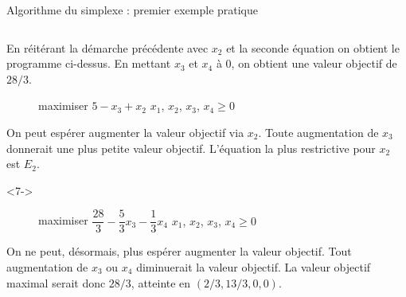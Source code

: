\documentclass[aspectratio = 169]{beamer}
\begin{document}
\begin{frame}{Algorithme du simplexe : premier exemple pratique}
\begin{columns}
\begin{column}{.5\textwidth}
\begin{onlyenv}
{{\begin{figure}
                \end{figure}
              } \vspace{-1em}
              En réitérant la démarche précédente avec $x_2$ et la
              seconde équation on obtient le programme ci-dessus. En
              mettant $x_3$ et $x_4$ à $0$, on obtient une valeur
              objectif de $28/3$.  }{
                \begin{figure}
                  \small{
                    \begin{linearProg}{
                        maximiser
                      }{
                        $5 - x_3 + x_2$
                      }{
                      }{
                        $x_1$, $x_2$, $x_3$, $x_4 \geq 0$
                      }
                    \end{linearProg}
                  }
                \end{figure}
                On peut espérer augmenter la valeur objectif via
                $x_2$. Toute augmentation de $x_3$ donnerait une plus
                petite valeur objectif. L'équation la plus restrictive
                pour $x_2$ est $E_2$.  }
            \end{onlyenv}
            \begin{onlyenv}<7->
                \begin{figure}
                  \small{
                    \begin{linearProg}{
                        maximiser
                      }{
                        $\dfrac{28}{3} - \dfrac{5}{3}x_3 - \dfrac{1}{3}x_4$
                      }{
                      }{
                        $x_1$, $x_2$, $x_3$, $x_4 \geq 0$
                      }
                    \end{linearProg}
                  }
                \end{figure}
                \vspace{-1em}
                On ne peut, désormais, plus espérer augmenter la
                valeur objectif. Tout augmentation de $x_3$ ou $x_4$
                diminuerait la valeur objectif. La valeur objectif
                maximal serait donc $28/3$, atteinte en
                $(2/3, 13/3, 0, 0)$.
            \end{onlyenv}
        \end{column}

\end{columns}
\end{frame}
\end{document}
